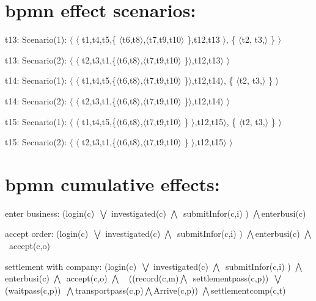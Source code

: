 \documentclass[runningheads]{llncs}
\begin{document}
\section{bpmn effect scenarios:}
t13: Scenario(1): $\langle$  $\langle$  t1,t4,t5,\{ $\langle$t6,t8$\rangle$,$\langle$t7,t9,t10$\rangle$ \},t12,t13 $\rangle$, \{  $\langle$t2, t3,$\rangle$   \}  $\rangle$

\noindent t13: Secnario(2): $\langle$  $\langle$  t2,t3,t1,\{$\langle$t6,t8$\rangle$,$\langle$t7,t9,t10$\rangle$ \}$\rangle$,t12,t13$\rangle$	$\rangle$

\noindent t14: Secnario(1): $\langle$  $\langle$  t1,t4,t5,\{$\langle$t6,t8$\rangle$,$\langle$t7,t9,t10$\rangle$ \}$\rangle$,t12,t14$\rangle$, \{  $\langle$t2, t3,$\rangle$   \}  $\rangle$

\noindent t14: Secnario(2): $\langle$  $\langle$  t2,t3,t1,\{$\langle$t6,t8$\rangle$,$\langle$t7,t9,t10$\rangle$ \}$\rangle$,t12,t14$\rangle$	$\rangle$

\noindent t15: Secnario(1): $\langle$  $\langle$  t1,t4,t5,\{$\langle$t6,t8$\rangle$,$\langle$t7,t9,t10$\rangle$ \} $\rangle$,t12,t15$\rangle$, \{  $\langle$t2, t3,$\rangle$   \}	$\rangle$

\noindent t15: Secnario(2): $\langle$  $\langle$  t2,t3,t1,\{$\langle$t6,t8$\rangle$,$\langle$t7,t9,t10$\rangle$ \} $\rangle$,t12,t15$\rangle$	$\rangle$





\section{bpmn cumulative effects:}

enter business: (login(c)\ $\bigvee$ investigated(c) $\bigwedge$\ submitInfor(c,i) ) $\bigwedge$enterbusi(c)

\noindent accept order: (login(c)\ $\bigvee$ investigated(c) $\bigwedge$\ submitInfor(c,i) ) $\bigwedge$enterbusi(c) $\bigwedge$\  accept(c,o)

\noindent settlement with company: (login(c)\ $\bigvee$ investigated(c) $\bigwedge$\ submitInfor(c,i) ) $\bigwedge$enterbusi(c) $\bigwedge$\  accept(c,o) $\bigwedge$\ \ ((record(c,m)$\bigwedge$\ settlementpass(c,p))\ $\bigvee$(waitpass(c,p))\ $\bigwedge$transportpass(c,p)$\bigwedge$Arrive(c,p)) $\bigwedge$settlementcomp(c,t)
\end{document}
